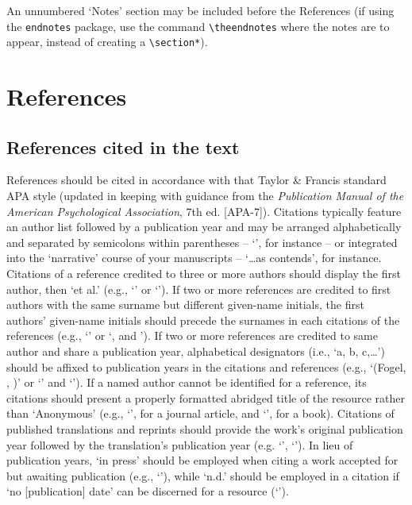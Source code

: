 \documentclass[]{interact}
\theoremstyle{plain}%
\theoremstyle{definition}
\theoremstyle{remark}
\begin{document}
An unnumbered `Notes' section may be included before the References (if using the \verb"endnotes" package, use the command \verb"\theendnotes" where the notes are to appear, instead of creating a \verb"\section*").


\section{References}

\subsection{References cited in the text}

References should be cited in accordance with that Taylor \& Francis standard APA style (updated in keeping with guidance from the \emph{Publication Manual of the American Psychological Association}, 7th ed. [APA-7]). Citations typically feature an author list followed by a publication year and may be arranged alphabetically and separated by semicolons within parentheses -- `\citep{bogdanovich1971,monk57}', for instance -- or integrated into the `narrative' course of your manuscripts -- `\ldots as \citet{bowlby82} contends', for instance. Citations of a reference credited to three or more authors should display the first author, then `et al.' (e.g., `\citep{dixon24}' or `\citet{dixon24}'). If two or more references are credited to first authors with the same surname but different given-name initials, the first authors' given-name initials should precede the surnames in each citations of the references (e.g., `\citep{gregoc25,gregoj22,gregol25}' or `\citet{gregoc25}, \citet{gregoj22} and \citet{gregol25}'). If two or more references are credited to same author and share a publication year, alphabetical designators (i.e., `a, b, c,\ldots') should be affixed to publication years in the citations and references (e.g., `(Fogel, \citeyear{fogelehpd04}, \citeyear{fogeljee0})' or `\citet{fogelehpd04}' and `\citet{fogeljee0}'). If a named author cannot be identified for a reference, its citations should present a properly formatted abridged title of the resource rather than `Anonymous' (e.g., `\citep{physician19}', for a journal article, and `\citet{dual93}', for a book). Citations of published translations and reprints should provide the work's original publication year followed by the translation's publication year (e.g. `\citep{piaget95}', `\citet{freud89}'). In lieu of publication years, `in press' should be employed when citing a work accepted for but awaiting publication (e.g., `\citet{watermeyerip}'), while  `n.d.' should be employed in a citation if `no [publication] date' can be discerned for a resource (`\citep{pittnd}').
\end{document}
